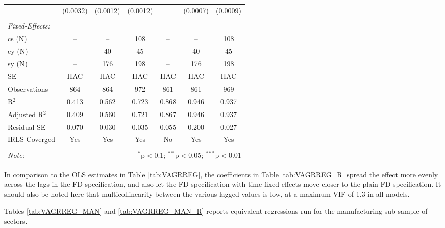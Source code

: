 \documentclass[a4paper]{article}
\begin{document}
\begin{table}[!htbp]
{\begin{tabular}[t]{lcccccc}
  & (0.0032) & (0.0012) & (0.0012) &  & (0.0007) & (0.0009) \\ 
  & & & & & & \\ 
\midrule \emph{Fixed-Effects:} &   &   &   &   &   &  \\
cs (N) & -- & -- & 108 & -- & -- & 108\\
cy (N) & -- & 40 & 45 & -- & 40 & 45\\
sy (N) & -- & 176 & 198 & -- & 176 & 198\\ \midrule
SE & HAC & HAC & HAC &HAC &HAC &HAC \\
Observations & 864 & 864 & 972 & 861 & 861 & 969 \\ 
R$^{2}$ & 0.413 & 0.562 & 0.723 & 0.868 & 0.946 & 0.937 \\ 
Adjusted R$^{2}$ & 0.409 & 0.560 & 0.721 & 0.867 & 0.946 & 0.937 \\ 
Residual SE & 0.070 & 0.030 & 0.035 & 0.055 & 0.200 & 0.027 \\ 
IRLS Coverged & Yes & Yes & Yes & No & Yes & Yes \\
\bottomrule \\ [-1em]
\textit{Note:}  & \multicolumn{6}{r}{$^{*}$p$<$0.1; $^{**}$p$<$0.05; $^{***}$p$<$0.01} \\ 
\end{tabular} 
}
\end{table} 
\FloatBarrier

In comparison to the OLS estimates in Table \ref{tab:VAGRREG}, the coefficients in Table \ref{tab:VAGRREG_R} spread the effect more evenly across the lags in the FD specification, and also let the FD specification with time fixed-effects move closer to the plain FD specification. It should also be noted here that multicollinearity between the various lagged values is low, at a maximum VIF of 1.3 in all models. \newline

Tables \ref{tab:VAGRREG_MAN} and \ref{tab:VAGRREG_MAN_R} reports equivalent regressions run for the manufacturing sub-sample of sectors. 
\end{document}
